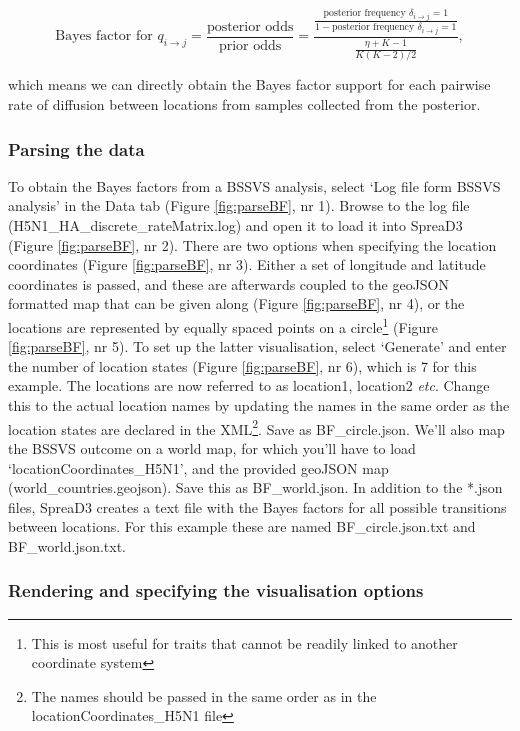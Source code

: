\documentclass[english]{paper}
\def \spreadname {SpreaD3}
\begin{document}
$$ \text{Bayes factor for $q_{i{\rightarrow}j}$} = \frac{ \text{posterior odds}}{\text{prior odds}} = \frac{\frac{\text{posterior frequency $\delta_{i{\rightarrow}j} = 1$}}{1 - \text{posterior frequency $\delta_{i{\rightarrow}j} = 1$}}}{\frac{\eta + K - 1}{K(K-2)/2}},$$

\noindent
which means we can directly obtain the Bayes factor support for each pairwise rate of diffusion between locations from samples collected from the posterior. 

\subsubsection{Parsing the data}

To obtain the Bayes factors from a BSSVS analysis, select `Log file form BSSVS analysis' in the Data tab (Figure \ref{fig:parseBF}, nr 1).
Browse to the log file (H5N1\_HA\_discrete\_rateMatrix.log) and open it to load it into {\spreadname} (Figure \ref{fig:parseBF}, nr 2).
There are two options when specifying the location coordinates (Figure \ref{fig:parseBF}, nr 3).
Either a set of longitude and latitude coordinates is passed, and these are afterwards coupled to the geoJSON formatted map that can be given along (Figure \ref{fig:parseBF}, nr 4), or the locations are represented by equally spaced points on a circle\footnote{This is most useful for traits that cannot be readily linked to another coordinate system} (Figure \ref{fig:parseBF}, nr 5).
To set up the latter visualisation, select `Generate' and enter the number of location states (Figure \ref{fig:parseBF}, nr 6), which is 7 for this example.
The locations are now referred to as location1, location2 \textit{etc}. 
Change this to the actual location names by updating the names in the same order as the location states are declared in the XML\footnote{The names should be passed in the same order as in the locationCoordinates\_H5N1 file}.
Save as BF\_circle.json.
We'll also map the BSSVS outcome on a world map, for which you'll have to load `locationCoordinates\_H5N1', and the provided geoJSON map (world\_countries.geojson).
Save this as BF\_world.json.
In addition to the *.json files, {\spreadname} creates a text file with the Bayes factors for all possible transitions between locations. 
For this example these are named BF\_circle.json.txt and BF\_world.json.txt.

\subsubsection{Rendering and specifying the visualisation options}
\end{document}
